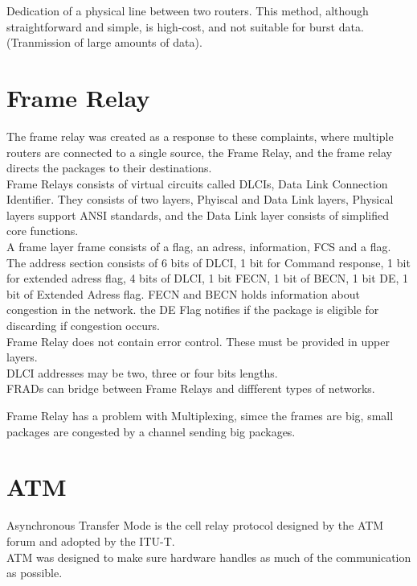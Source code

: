 \documentclass[11pt,a4paper,twoside]{book}
\begin{document}
Dedication of a physical line between two routers. This method, although straightforward and simple, is high-cost, and not suitable for burst data. (Tranmission of large amounts of data).

\section{Frame Relay}

The frame relay was created as a response to these complaints, where multiple routers are connected to a single source, the Frame Relay, and the frame relay directs the packages to their destinations.\\

Frame Relays consists of virtual circuits called DLCIs, Data Link Connection Identifier. They consists of two layers, Phyiscal and Data Link layers, Physical layers support ANSI standards, and the Data Link layer consists of simplified core functions.\\

A frame layer frame consists of a flag, an adress, information, FCS and a flag. The address section consists of 6 bits of DLCI, 1 bit for Command response, 1 bit for extended adress flag, 4 bits of DLCI, 1 bit FECN, 1 bit of BECN, 1 bit DE, 1 bit of Extended Adress flag. FECN and BECN holds information about congestion in the network. the DE Flag notifies if the package is eligible for discarding if congestion occurs.\\

Frame Relay does not contain error control. These must be provided in upper layers.\\

DLCI addresses may be two, three or four bits lengths.\\

FRADs can bridge between Frame Relays and diffferent types of networks.

Frame Relay has a problem with Multiplexing, simce the frames are big, small packages are congested by a channel sending big packages.

\section{ATM}

Asynchronous Transfer Mode is the cell relay protocol designed by the ATM forum and adopted by the ITU-T.\\

ATM was designed to make sure hardware handles as much of the communication as possible.\\
\end{document}
